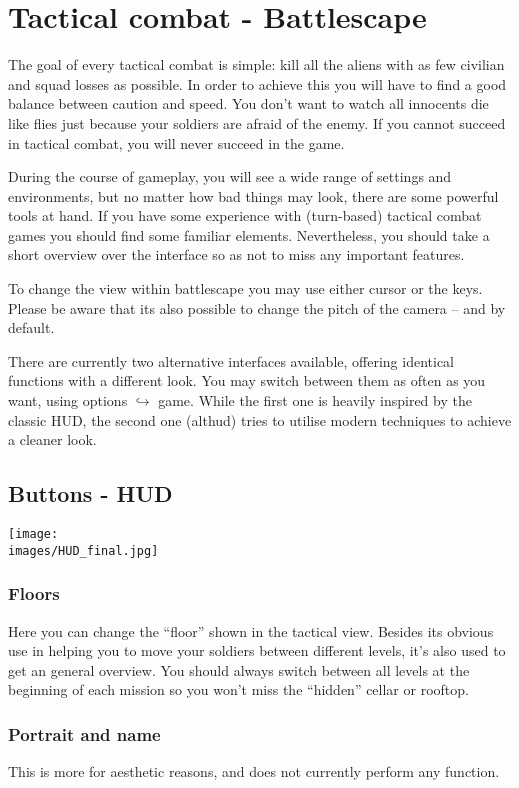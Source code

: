 \section{Tactical combat - Battlescape}

The goal of every tactical combat is simple: kill all the aliens with as few civilian and squad losses as possible. In order to achieve this you will have to find a good balance between caution and speed. You don't want to watch all innocents die like flies just because your soldiers are afraid of the enemy.  If you cannot succeed in tactical combat, you will never succeed in the game.

During the course of gameplay, you will see a wide range of settings and environments, but no matter how bad things may look, there are some powerful tools at hand. If you have some experience with (turn-based) tactical combat games you should find some familiar elements. Nevertheless, you should take a short overview over the interface so as not to miss any important features.

To change the view within battlescape you may use either cursor or the  keys. Please be aware that its also possible to change the pitch of the camera --  and  by default.

There are currently two alternative interfaces available, offering identical functions with a different look. You may switch between them as often as you want, using options $\hookrightarrow$ game. While the first one is heavily inspired by the classic HUD, the second one (althud) tries to utilise modern techniques to achieve a cleaner look.

\subsection{Buttons - HUD}
\texttt{[image: \\images/HUD\_final.jpg]}
\subsubsection{Floors}
Here you can change the ``floor'' shown in the tactical view. Besides its obvious use in helping you to move your soldiers between different levels, it's also used to get an general overview. You should always switch between all levels at the beginning of each mission so you won't miss the ``hidden'' cellar or rooftop.

\subsubsection{Portrait and name}
This is more for aesthetic reasons, and does not currently perform any function.

